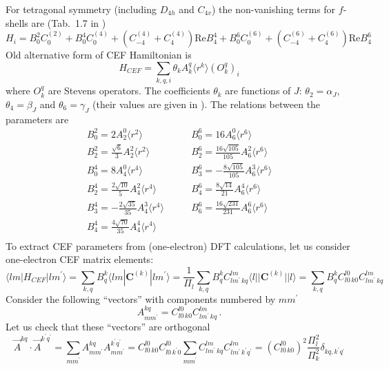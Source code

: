 \documentclass[a4paper,oneside,12pt]{extarticle}
\begin{document}
For tetragonal symmetry (including $D_{4h}$ and $C_{4v}$) the non-vanishing terms for $f$-shells  are (Tab.~1.7 in \cite{Jacquier})
%
$$
H_i = B_0^2 C_0^{(2)} + B_0^4 C_0^{(4)} + (C_{-4}^{(4)}+C_4^{(4)})\mathrm{Re}B_4^4 + B_0^6 C_0^{(6)} + (C_{-4}^{(6)}+C_4^{(6)}) \mathrm{Re}B_4^6
$$
%
Old alternative form of CEF Hamiltonian is
$$
H_{CEF} = \sum_{k,q,i} \theta_k A_k^q \langle r^k\rangle (O_k^q)_i
$$
where $O_k^q$ are Stevens operators. The coefficients $\theta_k$ are functions of $J$: $\theta_2=\alpha_J$, $\theta_4=\beta_J$ and $\theta_6=\gamma_J$ (their values are given in \cite{Hutchings}). The relations between the parameters are \cite{Jacquier}
%
\begin{equation} \label{eq1}
\begin{split}
	B_0^2 = 2 A_2^0 \langle r^2\rangle & \qquad B_0^6 = 16 A_6^0 \langle r^6\rangle \\
	B_2^2 = \frac{\sqrt{6}}{3} A_2^2 \langle r^2\rangle & \qquad B_2^6 = \frac{16 \sqrt{105}}{105} A_6^2 \langle r^6\rangle \\
	B_0^4 = 8 A_4^0 \langle r^4\rangle & \qquad B_3^6 = -\frac{8 \sqrt{105}}{105} A_6^3 \langle r^6\rangle \\
	B_2^4 = \frac{2\sqrt{10}}{5} A_4^2 \langle r^4\rangle & \qquad B_4^6 = \frac{8 \sqrt{14}}{21} A_6^4 \langle r^6\rangle \\
	B_3^4 = -\frac{2\sqrt{35}}{35} A_4^3 \langle r^4\rangle & \qquad B_6^6 = \frac{16 \sqrt{231}}{231} A_6^6 \langle r^6\rangle \\
	B_4^4 = \frac{4\sqrt{70}}{35} A_4^4 \langle r^4\rangle & \qquad \\
\end{split}
\end{equation}
%
To extract CEF parameters from (one-electron) DFT calculations, let us consider one-electron CEF matrix elements:
%
\begin{equation}
\langle lm | H_{CEF} | lm^{\prime} \rangle =
\sum_{k,q} B_q^k \langle lm | \mathbf{C}^{(k)} | lm^{\prime} \rangle = 
\frac{1}{\Pi_l} \sum_{k,q} B_q^k C_{lm^{\prime} \, kq}^{lm} \langle l || \mathbf{C}^{(k)} || l \rangle = 
\sum_{k,q} B_q^k C_{l 0 \, k 0}^{l 0} C_{lm^{\prime} \, kq}^{lm}
\end{equation}
%
Consider the following ``vectors'' with components numbered by $mm^{\prime}$
$$
A_{mm^{\prime}}^{kq} = C_{l 0 \, k 0}^{l 0} C_{lm^{\prime} \, kq}^{lm} \,.
$$
Let us check that these ``vectors'' are orthogonal
$$
\vec{A}^{kq}\cdot \vec{A}^{k^{\prime}q^{\prime}} =
\sum_{mm^{\prime}} A_{mm^{\prime}}^{kq} A_{mm^{\prime}}^{k^{\prime}q^{\prime}} = 
C_{l 0 \, k 0}^{l 0} C_{l 0 \, k^{\prime} 0}^{l 0}
\sum_{mm^{\prime}} C_{lm^{\prime} \, kq}^{lm} C_{lm^{\prime} \, k^{\prime}q^{\prime}}^{lm} =
\left(C_{l 0 \, k 0}^{l 0}\right)^2 \frac{\Pi^2_l}{\Pi^2_k} \delta_{kq,k^{\prime}q^{\prime}}
$$
\end{document}
